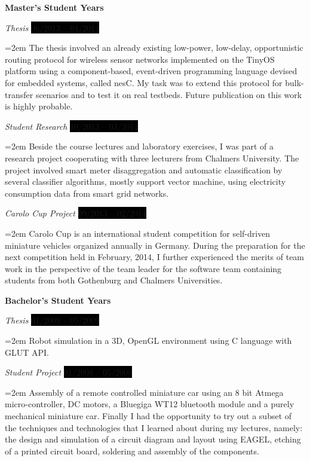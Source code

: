 \documentclass[paper=a4,fontsize=11pt]{scrartcl}	 			%
\newlength{\spacebox}
\newcommand{\sepspace}{\vspace*{0.5em}}			%
\newcommand{\NewPart}[1]{\section*{\uppercase{#1}}}
\newcommand{\PersonalEntry}[2]{
		\noindent\hangindent=2em\hangafter=0 		%
		\parbox{\spacebox}{						%
		\textit{#1}}								%
		\hspace{1.5em} #2 \par}					%
\newcommand{\SkillsEntry}[2]{						%
		\noindent\hangindent=2em\hangafter=0 		%
		\parbox{\spacebox}{						%
		\textit{#1}}								%
		\hspace{1.5em} #2 \par}					%
\newcommand{\EducationEntry}[4]{
		\noindent \textbf{#1} \par 					%
		\noindent \textit{#3} \hfill					%
		\colorbox{Black}{%
			\hfill\color{White}#2} \par				%
		\noindent\hangindent=2em\hangafter=0 \small #4 	%
		\normalsize \par}
\begin{document}
\EducationEntry{Master's Student Years}{06/2013 -- 04/2014}{Thesis}{The thesis involved an already existing low-power, low-delay, opportunistic routing protocol for wireless sensor networks implemented on the TinyOS platform using a component-based, event-driven programming language devised for embedded systems, called nesC. My task was to extend this protocol for bulk-transfer scenarios and to test it on real testbeds. Future publication on this work is highly probable.}
\EducationEntry{}{10/2013 -- 03/2014}{Student Research}{Beside the course lectures and laboratory exercises, I was part of a research project cooperating with three lecturers from Chalmers University. The project involved smart meter disaggregation and automatic classification by several classifier algorithms, mostly support vector machine, using electricity consumption data from smart grid networks.}
\EducationEntry{}{09/2013 -- 02/2014}{Carolo Cup Project}{Carolo Cup is an international student competition for self-driven miniature vehicles organized annually in Germany. During the preparation for the next competition held in February, 2014, I further experienced the merits of team work in the perspective of the team leader for the software team containing students from both Gothenburg and Chalmers Universities.}

\sepspace
\EducationEntry{Bachelor's Student Years}{01/2009 -- 05/2009}{Thesis}{Robot simulation in a 3D, OpenGL environment using C language with GLUT API.}
\EducationEntry{}{01/2008 -- 05/2008}{Student Project}{Assembly of a remote controlled miniature car using an 8 bit Atmega micro-controller, DC motors, a Bluegiga WT12 bluetooth module and a purely mechanical miniature car. Finally I had the opportunity to try out a subset of the techniques and technologies that I learned about during my lectures, namely: the design and simulation of a circuit diagram and layout using EAGEL, etching of a printed circuit board, soldering and assembly of the components.}


\end{document}
